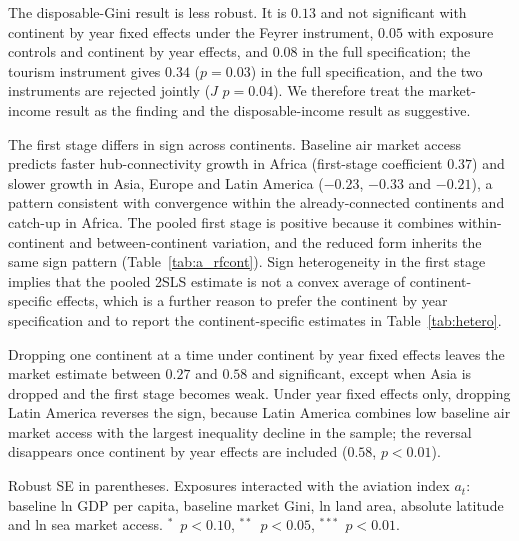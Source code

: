 \documentclass[12pt]{article}
\newcommand{\sym}[1]{\ensuremath{^{#1}}}
\begin{document}
The disposable-Gini result is less robust. It is $0.13$ and not significant with continent by year fixed effects under the Feyrer instrument, $0.05$ with exposure controls and continent by year effects, and $0.08$ in the full specification; the tourism instrument gives $0.34$ ($p=0.03$) in the full specification, and the two instruments are rejected jointly ($J$ $p=0.04$). We therefore treat the market-income result as the finding and the disposable-income result as suggestive.

The first stage differs in sign across continents. Baseline air market access predicts faster hub-connectivity growth in Africa (first-stage coefficient $0.37$) and slower growth in Asia, Europe and Latin America ($-0.23$, $-0.33$ and $-0.21$), a pattern consistent with convergence within the already-connected continents and catch-up in Africa. The pooled first stage is positive because it combines within-continent and between-continent variation, and the reduced form inherits the same sign pattern (Table~\ref{tab:a_rfcont}). Sign heterogeneity in the first stage implies that the pooled 2SLS estimate is not a convex average of continent-specific effects, which is a further reason to prefer the continent by year specification and to report the continent-specific estimates in Table~\ref{tab:hetero}.

Dropping one continent at a time under continent by year fixed effects leaves the market estimate between $0.27$ and $0.58$ and significant, except when Asia is dropped and the first stage becomes weak. Under year fixed effects only, dropping Latin America reverses the sign, because Latin America combines low baseline air market access with the largest inequality decline in the sample; the reversal disappears once continent by year effects are included ($0.58$, $p<0.01$).

\begin{table}[H]\centering\caption{Identification diagnostics for the shift-share instruments.}\label{tab:diag}
\begin{threeparttable}\small
\begin{tablenotes}\footnotesize\item Robust SE in parentheses. Exposures interacted with the aviation index $a_t$: baseline ln GDP per capita, baseline market Gini, ln land area, absolute latitude and ln sea market access. \sym{*}~$p<0.10$, \sym{**}~$p<0.05$, \sym{***}~$p<0.01$.\end{tablenotes}\end{threeparttable}\end{table}
\end{document}
